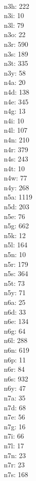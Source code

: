 \begin{multicols}{8}
  \\n3h: 222
  \\n3i: 10
  \\n3l: 79
  \\n3o: 22
  \\n3r: 590
  \\n3s: 189
  \\n3t: 335
  \\n3y: 58
  \\n4a: 20
  \\n4d: 138
  \\n4e: 345
  \\n4g: 13
  \\n4i: 10
  \\n4l: 107
  \\n4n: 210
  \\n4r: 379
  \\n4s: 243
  \\n4t: 10
  \\n4w: 77
  \\n4y: 268
  \\n5a: 1119
  \\n5d: 203
  \\n5e: 76
  \\n5g: 662
  \\n5k: 12
  \\n5l: 164
  \\n5n: 10
  \\n5r: 179
  \\n5s: 364
  \\n5t: 73
  \\n5y: 71
  \\n6a: 25
  \\n6d: 33
  \\n6e: 134
  \\n6g: 64
  \\n6l: 288
  \\n6n: 619
  \\n6p: 11
  \\n6r: 84
  \\n6s: 932
  \\n6y: 47
  \\n7a: 35
  \\n7d: 68
  \\n7e: 56
  \\n7g: 16
  \\n7i: 66
  \\n7l: 17
  \\n7n: 23
  \\n7r: 23
  \\n7s: 168

\end{multicols}
